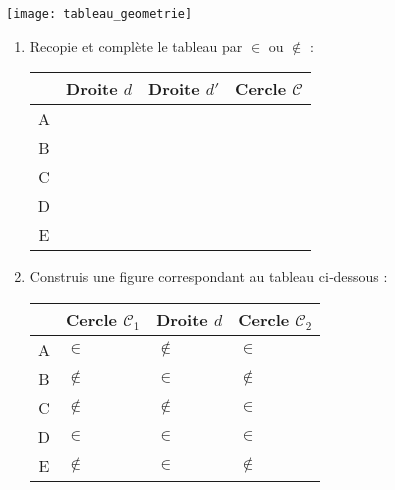 \begin{exercice}[En géométrie]
\begin{center} \texttt{[image: tableau\_geometrie]} \end{center}
\begin{enumerate}
 \item Recopie et complète le tableau par $\in$ ou $\notin$ : \\[0.3em]
  \begin{center}
 \begin{tabularx}{\linewidth}{|c|X|X|X|}
  \cline{2-4}
   & \cellcolor{F3} Droite $d$ & \cellcolor{F3} Droite $d'$ & \cellcolor{F3} Cercle $\mathcal{C}$ \\\hline
  \cellcolor{H3} A & & & \\\hline
  \cellcolor{H3} B & & & \\\hline
  \cellcolor{H3} C & & & \\\hline
  \cellcolor{H3} D & & & \\\hline
  \cellcolor{H3} E & & & \\\hline
  \end{tabularx}
\end{center}
\vspace{0.5cm}
 \item Construis une figure correspondant au tableau ci‑dessous : \\[0.3em]
  \begin{center}
 \begin{tabularx}{\linewidth}{|c|X|X|X|}
  \cline{2-4}
   & \cellcolor{F3} Cercle $\mathcal{C}_1$ & \cellcolor{F3} Droite $d$ & \cellcolor{F3} Cercle $\mathcal{C}_2$ \\\hline
  \cellcolor{H3} A & $\in$ & $\notin$ & $\in$ \\\hline
  \cellcolor{H3} B & $\notin$ & $\in$ & $\notin$ \\\hline
  \cellcolor{H3} C & $\notin$ & $\notin$ & $\in$ \\\hline
  \cellcolor{H3} D & $\in$ & $\in$ & $\in$ \\\hline
  \cellcolor{H3} E & $\notin$ & $\in$ & $\notin$ \\\hline
  \end{tabularx}
\end{center}
 \end{enumerate}
\end{exercice}